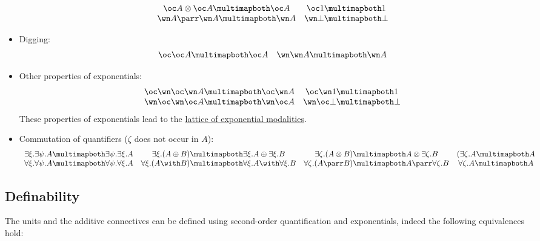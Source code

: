 \begin{itemize}
\begin{equation*}
\begin{array}{cc}
       \oc A \tens \oc A \linequiv \oc A & \oc \one \linequiv \one \\
       \wn A \parr \wn A \linequiv \wn A & \wn \bot \linequiv \bot
    \end{array}
  \end{equation*}
\item
  Digging:
  \begin{equation*}
    \begin{array}{cc}
       \oc\oc A \linequiv \oc A & \wn\wn A \linequiv \wn A
    \end{array}
  \end{equation*}
\item
  Other properties of exponentials:
  \begin{equation*}
    \begin{array}{cc}
       \oc\wn\oc\wn A \linequiv \oc\wn A & \oc\wn \one \linequiv \one \\
       \wn\oc\wn\oc A \linequiv \wn\oc A & \wn\oc \bot \linequiv \bot
    \end{array}
  \end{equation*}
These properties of exponentials lead to
the \hyperref[lattice-of-exponential-modalities]{lattice of exponential modalities}.
\item
  Commutation of quantifiers (\(\zeta\) does not occur in \(A\)):
  \begin{equation*}
    \begin{array}{cccc}
       \exists \xi. \exists \psi. A \linequiv \exists \psi. \exists \xi. A & \exists \xi.(A \plus B) \linequiv \exists \xi.A \plus \exists \xi.B & \exists \zeta.(A\tens B) \linequiv A\tens\exists \zeta.B & (\exists \zeta.A \linequiv A \\
       \forall \xi. \forall \psi. A \linequiv \forall \psi. \forall \xi. A & \forall \xi.(A \with B) \linequiv \forall \xi.A \with \forall \xi.B & \forall \zeta.(A\parr B) \linequiv A\parr\forall \zeta.B & \forall \zeta.A \linequiv A
    \end{array}
  \end{equation*}
\end{itemize}


\subsection{Definability}\label{definability}

The units and the additive connectives can be defined using second-order
quantification and exponentials, indeed the following equivalences hold:

